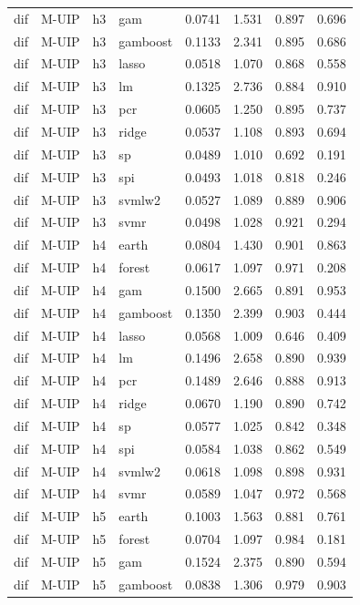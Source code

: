 \begin{ThreePartTable}
\begin{longtable}[t]{llclcccc}
dif & M-UIP & h3 & gam & 0.0741 & 1.531 & 0.897 & 0.696\\
dif & M-UIP & h3 & gamboost & 0.1133 & 2.341 & 0.895 & 0.686\\
dif & M-UIP & h3 & lasso & 0.0518 & 1.070 & 0.868 & 0.558\\
dif & M-UIP & h3 & lm & 0.1325 & 2.736 & 0.884 & 0.910\\
dif & M-UIP & h3 & pcr & 0.0605 & 1.250 & 0.895 & 0.737\\
dif & M-UIP & h3 & ridge & 0.0537 & 1.108 & 0.893 & 0.694\\
dif & M-UIP & h3 & sp & 0.0489 & 1.010 & 0.692 & 0.191\\
dif & M-UIP & h3 & spi & 0.0493 & 1.018 & 0.818 & 0.246\\
dif & M-UIP & h3 & svmlw2 & 0.0527 & 1.089 & 0.889 & 0.906\\
dif & M-UIP & h3 & svmr & 0.0498 & 1.028 & 0.921 & 0.294\\
\addlinespace
dif & M-UIP & h4 & earth & 0.0804 & 1.430 & 0.901 & 0.863\\
dif & M-UIP & h4 & forest & 0.0617 & 1.097 & 0.971 & 0.208\\
dif & M-UIP & h4 & gam & 0.1500 & 2.665 & 0.891 & 0.953\\
dif & M-UIP & h4 & gamboost & 0.1350 & 2.399 & 0.903 & 0.444\\
dif & M-UIP & h4 & lasso & 0.0568 & 1.009 & 0.646 & 0.409\\
dif & M-UIP & h4 & lm & 0.1496 & 2.658 & 0.890 & 0.939\\
dif & M-UIP & h4 & pcr & 0.1489 & 2.646 & 0.888 & 0.913\\
dif & M-UIP & h4 & ridge & 0.0670 & 1.190 & 0.890 & 0.742\\
dif & M-UIP & h4 & sp & 0.0577 & 1.025 & 0.842 & 0.348\\
dif & M-UIP & h4 & spi & 0.0584 & 1.038 & 0.862 & 0.549\\
dif & M-UIP & h4 & svmlw2 & 0.0618 & 1.098 & 0.898 & 0.931\\
dif & M-UIP & h4 & svmr & 0.0589 & 1.047 & 0.972 & 0.568\\
\addlinespace
dif & M-UIP & h5 & earth & 0.1003 & 1.563 & 0.881 & 0.761\\
dif & M-UIP & h5 & forest & 0.0704 & 1.097 & 0.984 & 0.181\\
dif & M-UIP & h5 & gam & 0.1524 & 2.375 & 0.890 & 0.594\\
dif & M-UIP & h5 & gamboost & 0.0838 & 1.306 & 0.979 & 0.903\\

\end{longtable}
\end{ThreePartTable}
